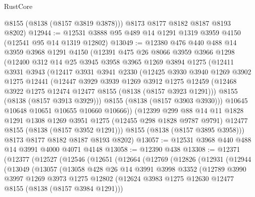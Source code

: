 \begin{lexlean}{RustCore}
\begin{coremodule}
        @8155
        (@8138 (@8157 @3819 @3878)))
      @8173
      @8177
      @8182
      @8187
      @8193
      @8202)
@12944 := @12531 @3888 @95 @489 @14 @1291 @1319 @3959 @4150 (@12541 @95 @14 @1319 @12802)
@13049 := @12380
    @476
    @440
    @488
    @14
    @3959
    @3968
    @1291
    @4150
    (@12391
      @475
      @26
      @8066
      @3959
      @3966
      @1298
      (@12400
        @312
        @14
        @25
        @3945
        @3958
        @3965
        @1269
        @3894
        @1275
        (@12411
          @3931
          @3943
          (@12417
            @3931
            @3941
            @2330
            (@12425
              @3930
              @3940
              @1269
              @3902
              @1275
              @12441
              (@12447
                @3929
                @3939
                @1269
                @3912
                @1275
                @12459
                (@12468 @3922 @1275 @12474 @12477 @8155 (@8138 (@8157 @3923 @1291)))
                @8155
                (@8138 (@8157 @3913 @3929)))
              @8155
              (@8138 (@8157 @3903 @3930)))
            @10645
            @10648
            @10651
            @10655
            @10660
            @10666))
        (@12399
          @299
          @88
          @14
          @11
          @1828
          @1291
          @1308
          @1269
          @3951
          @1275
          (@12455 @298 @1828 @9787 @9791)
          @12477
          @8155
          (@8138 (@8157 @3952 @1291)))
        @8155
        (@8138 (@8157 @3895 @3958)))
      @8173
      @8177
      @8182
      @8187
      @8193
      @8202)
@13057 := @12531 @3968 @440 @488 @14 @3991 @4000 @4071 @4148
@13058 := @12390 @438
@13308 := @12371
    (@12377
      (@12527
        (@12546
          (@12651
            (@12664
              (@12769
                (@12826
                  (@12931
                    (@12944
                      (@13049
                        (@13057
                          (@13058
                            @428
                            @26
                            @14
                            @3991
                            @3998
                            @3352
                            (@12789
                              @3990
                              @3997
                              @1269
                              @3973
                              @1275
                              @12802
                              (@12624 @3983 @1275 @12630 @12477 @8155 (@8138 (@8157 @3984 @1291)))

\end{coremodule}
\end{lexlean}
